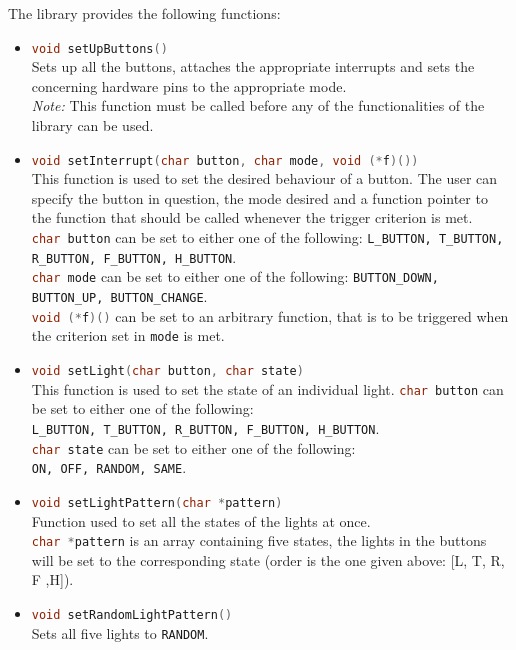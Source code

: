 \documentclass{report}
\begin{document}
The library provides the following functions:
\begin{itemize}
	\item \lstinline[language=c++]{void setUpButtons()} \\
		Sets up all the buttons, attaches the appropriate interrupts and sets the concerning hardware pins to the appropriate mode. \\
		\emph{Note:} This function must be called before any of the functionalities of the library can be used.
	\item \lstinline[language=c++]{void setInterrupt(char button, char mode, void (*f)())} \\
		This function is used to set the desired behaviour of a button. The user can specify the button in question, the mode desired and a function pointer to the function that should be called whenever the trigger criterion is met.\\
		\lstinline[language=c++]{char button} can be set to either one of the following: \lstinline{L_BUTTON, T_BUTTON, R_BUTTON, F_BUTTON, H_BUTTON}. \\
		\lstinline[language=c++]{char mode} can be set to either one of the following: \lstinline{BUTTON_DOWN, BUTTON_UP, BUTTON_CHANGE}. \\
		\lstinline[language=c++]{void (*f)()} can be set to an arbitrary function, that is to be triggered when the criterion set in \lstinline{mode} is met.
	\item \lstinline[language=c++]{void setLight(char button, char state)} \\
		This function is used to set the state of an individual light.
		\lstinline[language=c++]{char button} can be set to either one of the following:\\ \lstinline{L_BUTTON, T_BUTTON, R_BUTTON, F_BUTTON, H_BUTTON}. \\
		\lstinline[language=c++]{char state} can be set to either one of the following:\\ \lstinline{ON, OFF, RANDOM, SAME}.
	\item \lstinline[language=c++]{void setLightPattern(char *pattern)} \\
		Function used to set all the states of the lights at once. \\
		\lstinline[language=c++]{char *pattern} is an array containing five states, the lights in the buttons will be set to the corresponding state (order is the one given above: [L, T, R, F ,H]).
	\item \lstinline[language=c++]{void setRandomLightPattern()} \\
		Sets all five lights to \lstinline{RANDOM}.
\end{itemize}
\end{document}
